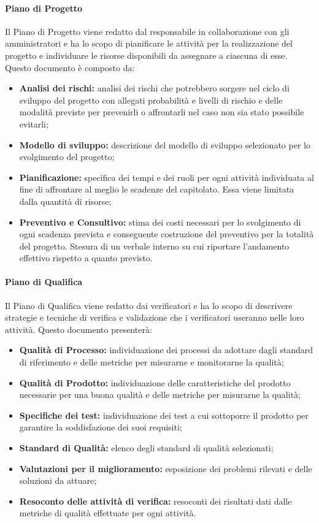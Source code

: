 \paragraph{Piano di Progetto}
Il Piano di Progetto viene redatto dal responsabile in collaborazione con gli amministratori e ha lo scopo di pianificare le attività per la realizzazione del progetto e individuare le risorse disponibili da assegnare a ciascuna di esse.
Questo documento è composto da:
\begin{itemize}
	\item \textbf{Analisi dei rischi:} analisi dei rischi che potrebbero sorgere nel ciclo di sviluppo del progetto con allegati probabilità e livelli di rischio e delle modalità previste per prevenirli o affrontarli nel caso non sia stato possibile evitarli;
	\item \textbf{Modello di sviluppo\glo:} descrizione del modello di sviluppo selezionato per lo svolgimento del progetto;
	\item \textbf{Pianificazione:} specifica dei tempi e dei ruoli per ogni attività individuata al fine di affrontare al meglio le scadenze del capitolato\glo. Essa viene limitata dalla quantità di risorse;
	\item \textbf{Preventivo e Consultivo:} stima dei costi necessari per lo svolgimento di ogni scadenza prevista e conseguente costruzione del preventivo per la totalità del progetto. Stesura di un verbale interno su cui riportare l'andamento effettivo rispetto a quanto previsto.
\end{itemize}
\paragraph{Piano di Qualifica}
Il Piano di Qualifica viene redatto dai verificatori e ha lo scopo di descrivere strategie e tecniche di verifica e validazione che i verificatori useranno nelle loro attività.
Questo documento presenterà:
\begin{itemize}
	\item \textbf{Qualità di Processo:} individuazione dei processi da adottare dagli standard di riferimento e delle metriche per misurarne e monitorarne la qualità;
	\item \textbf{Qualità di Prodotto:} individuazione delle caratteristiche del prodotto necessarie per una buona qualità e delle metriche per misurarne la qualità;
	\item \textbf{Specifiche dei test:} individuazione dei test a cui sottoporre il prodotto per garantire la soddisfazione dei suoi requisiti;
	\item \textbf{Standard di Qualità:} elenco degli standard di qualità selezionati;
	\item \textbf{Valutazioni per il miglioramento:} esposizione dei problemi rilevati e delle soluzioni da attuare;
	\item \textbf{Resoconto delle attività di verifica:} resoconti dei risultati dati dalle metriche di qualità effettuate per ogni attività.
\end{itemize}

